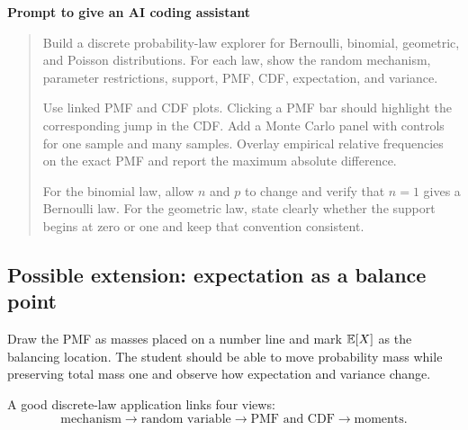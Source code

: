 \begin{examplebox}
\textbf{Prompt to give an AI coding assistant}

\begin{quote}\small
Build a discrete probability-law explorer for Bernoulli, binomial, geometric, and Poisson distributions. For each law, show the random mechanism, parameter restrictions, support, PMF, CDF, expectation, and variance.

Use linked PMF and CDF plots. Clicking a PMF bar should highlight the corresponding jump in the CDF. Add a Monte Carlo panel with controls for one sample and many samples. Overlay empirical relative frequencies on the exact PMF and report the maximum absolute difference.

For the binomial law, allow \(n\) and \(p\) to change and verify that \(n=1\) gives a Bernoulli law. For the geometric law, state clearly whether the support begins at zero or one and keep that convention consistent.
\end{quote}
\end{examplebox}

\subsection*{Possible extension: expectation as a balance point}

Draw the PMF as masses placed on a number line and mark \(\mathbb{E}[X]\) as the balancing location. The student should be able to move probability mass while preserving total mass one and observe how expectation and variance change.

\begin{summarybox}
A good discrete-law application links four views:
\[
\text{mechanism}
\longrightarrow
\text{random variable}
\longrightarrow
\text{PMF and CDF}
\longrightarrow
\text{moments}.
\]
\end{summarybox}
